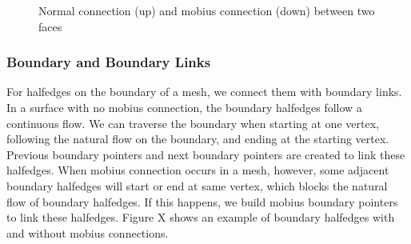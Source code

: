 \documentclass[12pt]{article}
\begin{document}
\begin{figure}[ht]
  \caption{Normal connection (up) and mobius connection (down) between two faces}
  \label{figure:faceConnections}
\end{figure}

\subsubsection{Boundary and Boundary Links}

For halfedges on the boundary of a mesh, we connect them with boundary links. In a surface with no mobius connection, the boundary halfedges follow a continuous flow. We can traverse the boundary when starting at one vertex, following the natural flow on the boundary, and ending at the starting vertex. Previous boundary pointers and next boundary pointers are created to link these halfedges. When mobius connection occurs in a mesh, however, some adjacent boundary halfedges will start or end at same vertex, which blocks the natural flow of boundary halfedges. If this happens, we build mobius boundary pointers to link these halfedges. Figure X shows an example of boundary halfedges with and without mobius connections.
\end{document}
